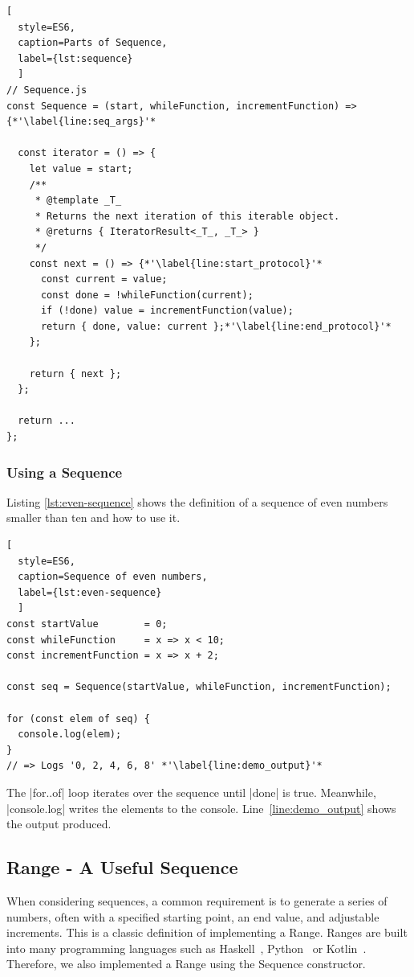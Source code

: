\begin{lstlisting}[
  style=ES6, 
  caption=Parts of Sequence,
  label={lst:sequence}
  ]
// Sequence.js
const Sequence = (start, whileFunction, incrementFunction) => {*'\label{line:seq_args}'*

  const iterator = () => {
    let value = start;
    /**
     * @template _T_
     * Returns the next iteration of this iterable object.
     * @returns { IteratorResult<_T_, _T_> }
     */
    const next = () => {*'\label{line:start_protocol}'*
      const current = value;
      const done = !whileFunction(current);
      if (!done) value = incrementFunction(value);
      return { done, value: current };*'\label{line:end_protocol}'*
    };

    return { next };
  };

  return ... 
};
\end{lstlisting}


\subsubsection{Using a Sequence}
\label{subsub:Using a Sequence}
Listing \ref{lst:even-sequence} shows the definition of a sequence of even 
numbers smaller than ten and how to use it. 
\begin{lstlisting}[
  style=ES6, 
  caption=Sequence of even numbers,
  label={lst:even-sequence}
  ]
const startValue        = 0;
const whileFunction     = x => x < 10;
const incrementFunction = x => x + 2;

const seq = Sequence(startValue, whileFunction, incrementFunction);

for (const elem of seq) {
  console.log(elem);
}
// => Logs '0, 2, 4, 6, 8' *'\label{line:demo_output}'*
\end{lstlisting}

The |for..of| loop iterates over the sequence until |done| is true. Meanwhile,
|console.log| writes the elements to the console.
Line~\ref{line:demo_output} shows the output produced.


\subsection{Range - A Useful Sequence}
\label{sub:Range - A Useful Sequence}
When considering sequences, a common requirement is to generate a series of
numbers, often with a specified starting point, an end value, and adjustable
increments. This is a classic definition of implementing a Range.
Ranges are built into many programming languages such as
Haskell~\cite{haskell_list},
Python~\cite{python_range}
or Kotlin~\cite{kotlin_ranges}. Therefore, we also implemented a Range using the Sequence constructor. 

